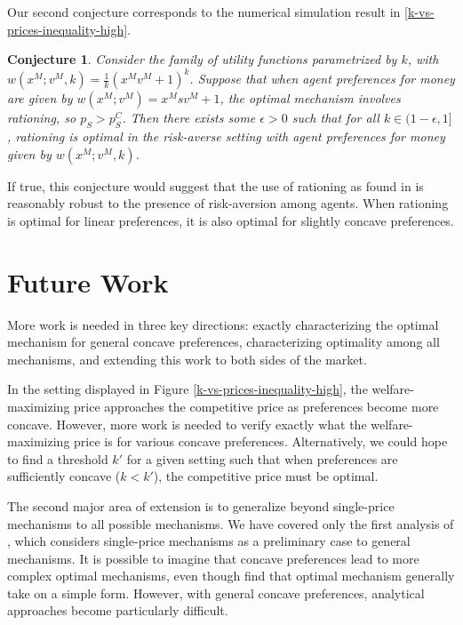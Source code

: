\documentclass[AER]{AEA}
\newtheorem{conj}[theorem]{Conjecture}
\begin{document}
Our second conjecture corresponds to the numerical simulation result in \ref{k-vs-prices-inequality-high}.

\begin{conj}
    \label{conj:rationing-robust}
    Consider the family of utility functions parametrized by $k$, with $w(x^M; v^M, k) = \frac{1}{k}(x^M v^M + 1)^k$. Suppose that when agent preferences for money are given by $w(x^M; v^M) = x^Ms v^M + 1$, the optimal mechanism involves rationing, so $p_S > p_S^C$. Then there exists some $\epsilon > 0$ such that for all $k \in (1-\epsilon, 1]$, rationing is optimal in the risk-averse setting with agent preferences for money given by $w(x^M; v^M, k)$.
\end{conj}

If true, this conjecture would suggest that the use of rationing as found in \cite{dworczak-2020} is reasonably robust to the presence of risk-aversion among agents. When rationing is optimal for linear preferences, it is also optimal for slightly concave preferences.

\section{Future Work}

More work is needed in three key directions: exactly characterizing the optimal mechanism for general concave preferences, characterizing optimality among all mechanisms, and extending this work to both sides of the market.

In the setting displayed in Figure \ref{k-vs-prices-inequality-high}, the welfare-maximizing price approaches the competitive price as preferences become more concave. However, more work is needed to verify exactly what the welfare-maximizing price is for various concave preferences. Alternatively, we could hope to find a threshold $k'$ for a given setting such that when preferences are sufficiently concave ($k < k'$), the competitive price must be optimal.

The second major area of extension is to generalize beyond single-price mechanisms to all possible mechanisms. We have covered only the first analysis of \cite{dworczak-2020}, which considers single-price mechanisms as a preliminary case to general mechanisms. It is possible to imagine that concave preferences lead to more complex optimal mechanisms, even though \cite{dworczak-2020} find that optimal mechanism generally take on a simple form. However, with general concave preferences, analytical approaches become particularly difficult. 
\end{document}
